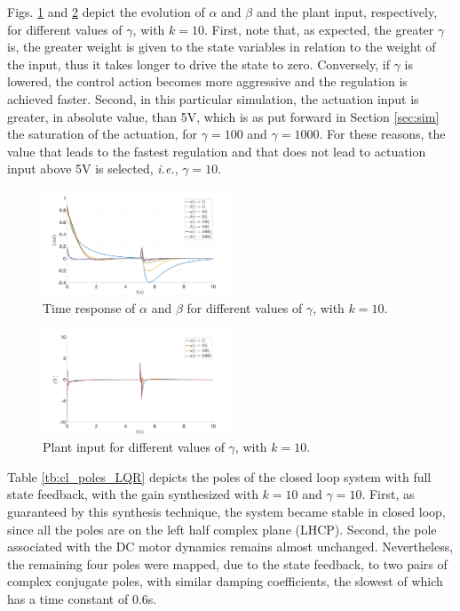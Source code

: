 \documentclass[letterpaper, 10 pt, conference]{ieeeconf}
\begin{document}
Figs. \ref{fig:LQR_gamma} and \ref{fig:LQR_gamma_u} depict the evolution of $\alpha$ and $\beta$ and the plant input, respectively, for different values of $\gamma$, with $k = 10$. First, note that, as expected, the greater $\gamma$ is, the greater weight is given to the state variables in relation to the weight of the input, thus it takes longer to drive the state to zero. Conversely, if $\gamma$ is lowered, the control action becomes more aggressive and the regulation is achieved faster. Second, in this particular simulation, the actuation input is greater, in absolute value, than 5V, which is as put forward in Section \ref{sec:sim} the saturation of the actuation, for $\gamma = 100$ and $\gamma= 1000$. For these reasons, the value that leads to the fastest regulation and that does not lead to actuation input above 5V is selected, \textit{i.e.}, $\gamma = 10$. 
\begin{figure}[h]
    \centering
    \includegraphics[width = 0.5\textwidth]{figures/LQR_gamma.png}
    \caption{Time response of $\alpha$ and $\beta$ for different values of $\gamma$, with $k = 10$.}
    \label{fig:LQR_gamma}
\end{figure}
\begin{figure}[h]
    \centering
    \includegraphics[width = 0.5\textwidth]{figures/LQR_gamma_u.png}
    \caption{Plant input for different values of $\gamma$, with $k = 10$.}
    \label{fig:LQR_gamma_u}
\end{figure}

Table \ref{tb:cl_poles_LQR} depicts the poles of the closed loop system with full state feedback, with the gain synthesized with $k=10$ and $\gamma = 10$. First, as guaranteed by this synthesis technique, the system became stable in closed loop, since all the poles are on the left half complex plane (LHCP). Second, the pole associated with the DC motor dynamics remains almost unchanged. Nevertheless, the remaining four poles were mapped, due to the state feedback, to two pairs of complex conjugate poles, with similar damping coefficients, the slowest of which has a time constant of 0.6s.
\end{document}
